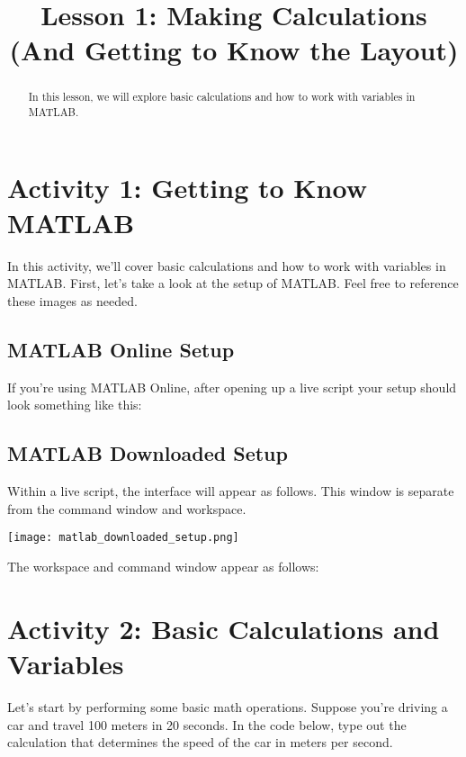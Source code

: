 \documentclass{ximera}
\title{Lesson 1: Making Calculations (And Getting to Know the Layout)}
\begin{document}
\begin{abstract}
In this lesson, we will explore basic calculations and how to work with variables in MATLAB.
\end{abstract}

\section*{Activity 1: Getting to Know MATLAB}

In this activity, we'll cover basic calculations and how to work with variables in MATLAB. 
First, let's take a look at the setup of MATLAB. Feel free to reference these images as needed.

\subsection*{MATLAB Online Setup}

If you're using MATLAB Online, after opening up a live script your setup should look something like this:


\subsection*{MATLAB Downloaded Setup}

Within a live script, the interface will appear as follows. This window is separate from the command window and workspace.

\begin{center}
\texttt{[image: matlab\_downloaded\_setup.png]}
\end{center}

The workspace and command window appear as follows:


\section*{Activity 2: Basic Calculations and Variables}

Let's start by performing some basic math operations. Suppose you're driving a car and travel 100 meters in 20 seconds.
In the code below, type out the calculation that determines the speed of the car in meters per second.
\end{document}
